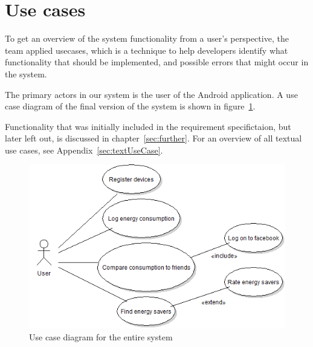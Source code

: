\section{Use cases}
To get an overview of the system functionality from a user's perspective, the team applied \glspl{usecase}, which is a technique to help developers identify what functionality that should be implemented, and possible errors that might occur in the system.

The primary actors in our system is the user of the Android application. A use case diagram of the final version of the system is shown in figure~\ref{fig:usecase}.

Functionality that was initially included in the requirement specifictaion, but later left out, is discussed in chapter~\ref{sec:further}. 
For an overview of all textual use cases, see Appendix~\ref{sec:textUseCase}.\\

\begin{figure}[H]
\includegraphics[width=\textwidth]{ch/specification/fig/currentUsecase.png}
\caption{Use case diagram for the entire system}
\label{fig:usecase}
\end{figure}
